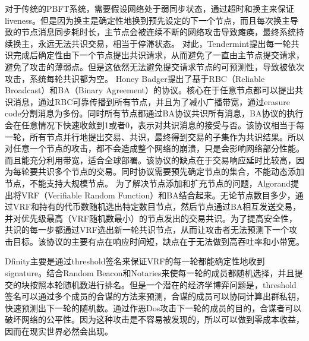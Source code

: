 \documentclass[12pt, UTF8]{article}
\begin{document}
对于传统的PBFT\cite{castro1999practical, castro2002practical}系统，需要假设网络处于弱同步状态，通过超时和换主来保证liveness。但是因为换主是确定性地换到预先设定的下一个节点，而且每次换主导致的节点消息同步耗时长，主节点会被连续不断的网络攻击导致瘫痪，最终系统持续换主，永远无法共识交易，相当于停滞状态。
对此，Tendermint\cite{kwon2014tendermint}提出每一轮共识完成后确定性由下一个节点提出共识请求，从而避免了一直由主节点提交请求，避免了攻击的薄弱点。但是这依然无法避免提交请求节点的可预测性，导致被依次攻击，系统每轮共识都为空。
Honey Badger\cite{miller2016honey}提出了基于RBC（Reliable Broadcast）和BA（Binary Agreement）的协议。核心在于任意节点都可以提出共识消息，通过RBC可靠传播到所有节点，并且为了减小广播带宽，通过erasure code分割消息为多份。同时所有节点都通过BA协议共识所有消息，BA协议的执行会在任意情况下快速收敛到1或者0，表示对共识消息的接受与否。该协议相当于每一轮，所有节点并行地提出交易、共识，最终得到交易的子集作为共识结果。所以对任意一个节点的攻击，都不会造成整个网络的崩溃，只是会影响网络部分性能。而且能充分利用带宽，适合全球部署。该协议的缺点在于交易响应延时比较高，因为每轮要共识多个节点的交易。同时协议需要预先确定节点的集合，不能动态添加节点，不能支持大规模节点。
为了解决节点添加和扩充节点的问题，Algorand\cite{gilad2017algorand}提出将VRF（Verifiable Random Function）\cite{micali1999verifiable}和BA结合起来。无论节点数目多少，通过VRF和持有的代币数随机选出特定数目节点，然后节点通过BA相互发送交易，并对优先级最高（VRF随机数最小）的节点发出的交易共识。为了提高安全性，共识的每一步都通过VRF选出新一轮共识节点，从而让攻击者无法预测下一个攻击目标。该协议的主要有点在响应时间短，缺点在于无法做到高吞吐率和小带宽。

Dfinity\cite{hanke2018dfinity}主要是通过threshold签名来保证VRF的每一轮都能确定性地收到signature。结合Random Beacon和Notaries来使每一轮的成员都随机选择，并且提交的块按照本轮随机数进行排名。但是一个潜在的经济学博弈问题是，threshold签名可以通过多个成员的合谋的方法来预测，合谋的成员可以协同计算出群私钥，快速预测出下一轮的随机数。通过作恶Dos攻击下一轮的成员的目的，合谋者可以破坏网络的公平性。因为这种攻击是不容易被发现的，所以可以做到零成本收益，因而在现实世界必然会出现。
\end{document}
